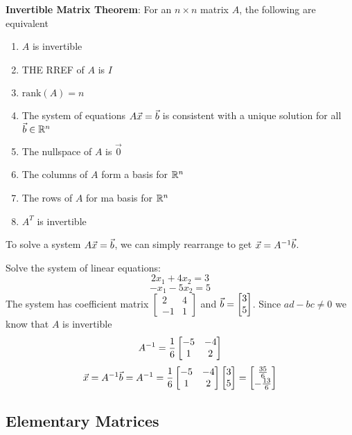 \documentclass[english, 12pt]{article}
\begin{document}
\begin{thrm}
\textbf{Invertible Matrix Theorem}:
For an $n \times n$ matrix $A$, the following are equivalent
\begin{enumerate}
\item $A$ is invertible
\item THE RREF of $A$ is $I$
\item $\text{rank}(A) = n$
\item The system of equations $A\vec{x} = \vec{b}$ is consistent with a unique solution for all $\vec{b} \in {\mathbb{R}}^n$
\item The nullspace of $A$ is $\vec{0}$
\item The columns of $A$ form a basis for ${\mathbb{R}}^n$
\item The rows of $A$ for ma basis for ${\mathbb{R}}^n$
\item $A^T$ is invertible
\end{enumerate}
To solve a system $A\vec{x} = \vec{b}$, we can simply rearrange to get $\vec{x} = A^{-1} \vec{b}$.
\end{thrm}

\begin{exmp}
Solve the system of linear equations:
\[2x_1 + 4x_2 = 3\]
\[-x_1 - 5x_2 = 5\]
The system has coefficient matrix $\begin{bmatrix} 2 & 4 \\ -1 & 1\end{bmatrix}$ and $\vec{b} = \begin{bmatrix} 3 \\ 5 \end{bmatrix}$. Since $ad-bc \neq 0$ we know that $A$ is invertible
\[A^{-1} = \frac{1}{6} \begin{bmatrix} -5 & -4 \\ 1 & 2 \end{bmatrix}\]
\[\vec{x} = A^{-1}\vec{b} = A^{-1} = \frac{1}{6} \begin{bmatrix} -5 & -4 \\ 1 & 2 \end{bmatrix} \begin{bmatrix} 3 \\ 5 \end{bmatrix} = \begin{bmatrix} \frac{35}{6} \\ -\frac{13}{6} \end{bmatrix}\]
\end{exmp}

\subsection{Elementary Matrices}
\end{document}
